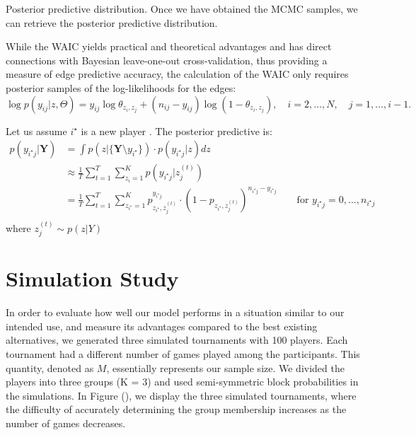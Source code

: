 \documentclass[11pt]{amsart}
\begin{document}
Posterior predictive distribution. 
Once we have obtained the MCMC samples, we can retrieve the posterior predictive distribution.

While the WAIC yields practical and theoretical advantages  and has direct connections with Bayesian leave-one-out cross-validation, thus providing a measure of edge predictive accuracy, the calculation of the WAIC only requires posterior samples of the log-likelihoods for the edges:
\begin{equation}
\log p(y_{ij} | z, \Theta) = y_{ij} \log \theta_{z_i, z_j} + (n_{ij}- y_{ij}) \log(1 - \theta_{z_i, z_j}), \quad i = 2, \ldots, N, \quad j = 1, \ldots, i - 1.
\end{equation}

Let us assume $i^\star$ is a new player . The posterior predictive is:
\begin{align}
p(y_{i^\star j}| \textbf{Y}) &= \int p(z| \{ \textbf{Y}\setminus y_{i^\star} \})  \cdot p(y_{i^\star j} | z ) dz \\
&\approx \frac{1}{T} \sum_{t = 1}^{T} \sum_{z_i=1}^{K}  p(y_{i^\star j}| z_j^{(t)}) \\
&=  \frac{1}{T} \sum_{t = 1}^{T} \sum_{z_{i^\star} =1}^{K}  p_{z_{i^\star}, z_j^{(t)}}^{y_{i^\star j} } \cdot (1-p_{z_{i^\star}, z_j^{(t)}})^{n_{i^\star j} -  y_{i^\star j}} \quad \quad \text{for }y_{i^\star j} = 0,\ldots, n_{i^\star j} \\
\end{align} 
where $z_j^{(t)} \sim p(z|Y)$
\section{Simulation Study}

In order to evaluate how well our model performs in a situation similar to our intended use, and measure its advantages compared to the best existing alternatives, we generated three simulated tournaments with 100 players. Each tournament had a different number of games played among the participants. This quantity, denoted as $M$, essentially represents our sample size. We divided the players into three groups (K = 3) and used semi-symmetric block probabilities in the simulations. In Figure (), we display the three simulated tournaments, where the difficulty of accurately determining the group membership increases as the number of games decreases.
\end{document}
